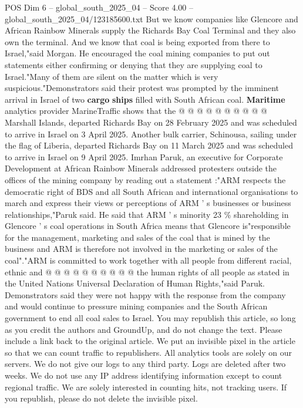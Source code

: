 \begin{textsample}{POS Dim 6 – global\_south\_2025\_04 – Score 4.00 – global\_south\_2025\_04/123185600.txt}
But we know companies like Glencore and African Rainbow Minerals supply the Richards Bay Coal Terminal and they also own the terminal.
And we know that coal is being exported from there to Israel,"said Morgan.
He encouraged the coal mining companies to put out statements either confirming or denying that they are supplying coal to Israel."Many of them are silent on the matter which is very suspicious."Demonstrators said their protest was prompted by the imminent arrival in Israel of two \textbf{cargo} \textbf{ships} filled with South African coal. \textbf{Maritime} analytics provider MarineTraffic shows that the @ @ @ @ @ @ @ @ @ @ Marshall Islands, departed Richards Bay on 28 February 2025 and was scheduled to arrive in Israel on 3 April 2025.
Another bulk carrier, Schinousa, sailing under the flag of Liberia, departed Richards Bay on 11 March 2025 and was scheduled to arrive in Israel on 9 April 2025.
Imrhan Paruk, an executive for Corporate Development at African Rainbow Minerals addressed protesters outside the offices of the mining company by reading out a statement :"ARM respects the democratic right of BDS and all South African and international organisations to march and express their views or perceptions of ARM ' s businesses or business relationships,"Paruk said.
He said that ARM ' s minority 23 \% shareholding in Glencore ' s coal operations in South Africa means that Glencore is"responsible for the management, marketing and sales of the coal that is mined by the business and ARM is therefore not involved in the marketing or sales of the coal"."ARM is committed to work together with all people from different racial, ethnic and @ @ @ @ @ @ @ @ @ @ the human rights of all people as stated in the United Nations Universal Declaration of Human Rights,"said Paruk.
Demonstrators said they were not happy with the response from the company and would continue to pressure mining companies and the South African government to end all coal sales to Israel.
You may republish this article, so long as you credit the authors and GroundUp, and do not change the text.
Please include a link back to the original article.
We put an invisible pixel in the article so that we can count traffic to republishers.
All analytics tools are solely on our servers.
We do not give our logs to any third party.
Logs are deleted after two weeks.
We do not use any IP address identifying information except to count regional traffic.
We are solely interested in counting hits, not tracking users.
If you republish, please do not delete the invisible pixel.

\end{textsample}
